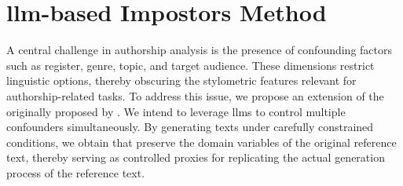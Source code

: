 \chapter{\acs{llm}-based Impostors Method}
\label{chap:llm_impostor_method}

A central challenge in authorship analysis is the presence of confounding factors such as register, genre, topic, and target audience. 
These dimensions restrict linguistic options, thereby obscuring the stylometric features relevant for authorship-related tasks. 
To address this issue, we propose an extension of the \impAppr{} originally proposed by \citet{koppel_determining_2014}.
We intend to leverage \acp{llm} to control multiple confounders simultaneously.
By generating texts under carefully constrained conditions, we obtain \imps{} that preserve the domain variables of the original reference text, thereby serving as controlled proxies for replicating the actual generation process of the reference text.






